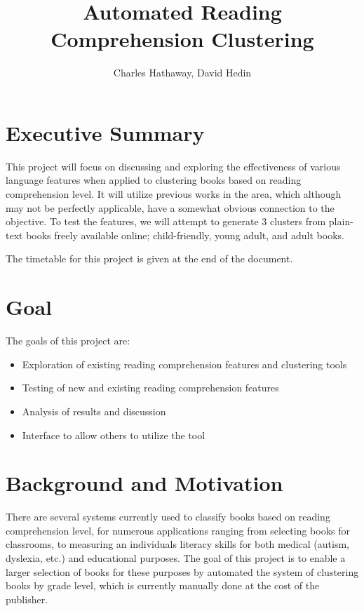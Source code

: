 \documentclass[]{article}
\title{Automated Reading Comprehension Clustering}
\author{Charles Hathaway, David Hedin}
\begin{document}
\maketitle

\section{Executive Summary}

This project will focus on discussing and exploring the effectiveness of various language features when applied to clustering books based on reading comprehension level.
It will utilize previous works in the area, which although may not be perfectly applicable, have a somewhat obvious connection to the objective.
To test the features, we will attempt to generate 3 clusters from plain-text books freely available online; child-friendly, young adult, and adult books.

The timetable for this project is given at the end of the document.

\section{Goal}

The goals of this project are:
\begin{itemize}
	\item Exploration of existing reading comprehension features and clustering tools
	\item Testing of new and existing reading comprehension features
	\item Analysis of results and discussion
	\item Interface to allow others to utilize the tool
\end{itemize}

\section{Background and Motivation}

There are several systems currently used to classify books based on reading comprehension level, for numerous applications ranging from selecting books for classrooms, to measuring an individuals literacy skills for both medical (autism, dyslexia, etc.) and educational purposes.
The goal of this project is to enable a larger selection of books for these purposes by automated the system of clustering books by grade level, which is currently manually done at the cost of the publisher.
\end{document}
